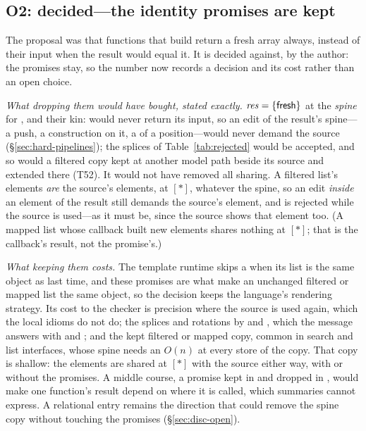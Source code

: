 \subsection*{O2: decided---the identity promises are kept}

The proposal was that functions that build return a fresh array always, instead of their input when the
result would equal it. It is decided against, by the author: the promises stay, so the number now records a
decision and its cost rather than an open choice.

\emph{What dropping them would have bought, stated exactly.} $\mathit{res} = \{\mathsf{fresh}\}$ at the
\emph{spine} for ,  and their kin:  would never return its input, so an
edit of the result's spine---a push, a construction on it, a  of a position---would never
demand the source (\S\ref{sec:hard-pipelines}); the splices of Table~\ref{tab:rejected} would be accepted,
and so would a filtered copy kept at another model path beside its source and extended there (T52). It
would not have removed all sharing. A filtered list's elements \emph{are} the source's elements, at
$[\ast]$, whatever the spine, so an edit \emph{inside} an element of the result still demands the
source's element, and is rejected while the source is used---as it must be, since the source shows that
element too. (A mapped list whose callback built new elements shares nothing at $[\ast]$; that is the
callback's result, not the promise's.)

\emph{What keeping them costs.} The template runtime skips a  when its list is the same object
as last time, and these promises are what make an unchanged filtered or mapped list the same object, so
the decision keeps the language's rendering strategy. Its cost to the checker is precision where the source
is used again, which the local idioms do not do; the splices and rotations by  and ,
which the message answers with  and ; and the kept filtered or
mapped copy, common in search and list interfaces, whose spine needs an $O(n)$  at every
store of the copy. That copy is shallow: the elements are shared at $[\ast]$ with the source either way,
with or without the promises. A middle course, a promise kept in  and dropped in ,
would make one function's result depend on where it is called, which summaries cannot express. A relational
entry remains the direction that could remove the spine copy without touching the promises
(\S\ref{sec:disc-open}).

